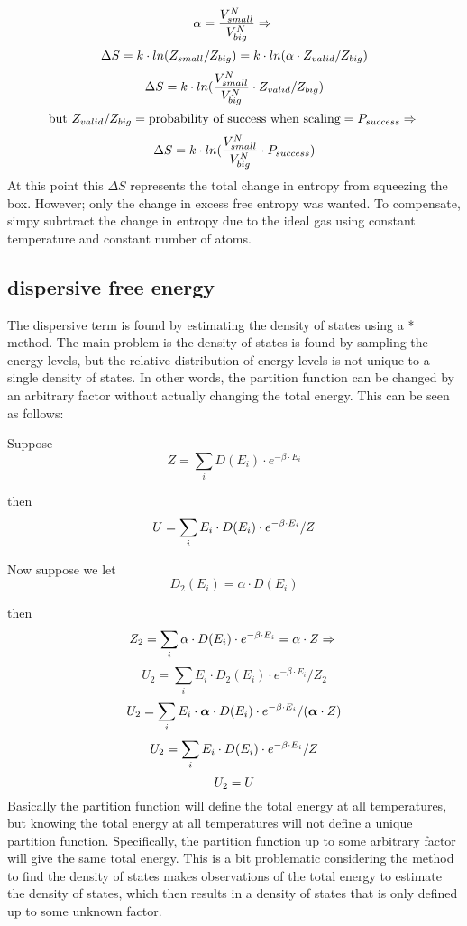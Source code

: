 $$\newline \alpha=\frac{V_{small}^N}{V_{big}^N} \Rightarrow\newline$$
$$\Delta S=k\cdot ln(Z_{small}/Z_{big})=k\cdot ln(\alpha\cdot Z_{valid}/Z_{big})\newline$$
$$\Delta S=k\cdot ln(\frac{V_{small}^N}{V_{big}^N}\cdot Z_{valid}/Z_{big})\newline$$
$$\text{but }Z_{valid}/Z_{big}=\text{probability of success when scaling}=P_{success}\Rightarrow\newline$$
$$\Delta S=k\cdot ln(\frac{V_{small}^N}{V_{big}^N}\cdot P_{success}
)\newline$$
At this point this $\Delta S$ represents the total change in entropy from squeezing the box. However; only the change in excess free entropy was wanted. To compensate, simpy subrtract the change in entropy due to the ideal gas using constant temperature and constant number of atoms.



\subsection{dispersive free energy}
The dispersive term is found by estimating the density of states using a * method. The main problem is the density of states is found by sampling the energy levels, but the relative distribution of energy levels is not unique to a single density of states. In other words, the partition function can be changed by an arbitrary factor without actually changing the total energy. This can be seen as follows:

Suppose $$Z=\sum_i D(E_i)\cdot e^{-\beta\cdot E_i}$$

then $$U=\sum_i E_i\cdot D(E_i)\cdot e^{-\beta\cdot E_i}/Z\newline$$

Now suppose we let $$D_2(E_i)=\alpha\cdot D(E_i)$$

then $$Z_2=\sum_i \alpha\cdot D(E_i)\cdot e^{-\beta\cdot E_i}=\alpha\cdot Z\Rightarrow\newline$$
$$U_2=\sum_i E_i\cdot D_2(E_i)\cdot e^{-\beta\cdot E_i}/Z_2$$
$$\newline U_2=\sum_i E_i\cdot \boldsymbol{\alpha}\cdot D(E_i)\cdot e^{-\beta\cdot E_i}/(\boldsymbol{\alpha}\cdot Z)$$
$$\newline U_2=\sum_i E_i\cdot D(E_i)\cdot e^{-\beta\cdot E_i}/Z$$
$$\newline U_2=U\newline$$
Basically the partition function will define the total energy at all temperatures, but knowing the total energy at all temperatures will not define a unique partition function. Specifically, the partition function up to some arbitrary factor will give the same total energy. This is a bit problematic considering the method to find the density of states makes observations of the total energy to estimate the density of states, which then results in a density of states that is only defined up to some unknown factor.

